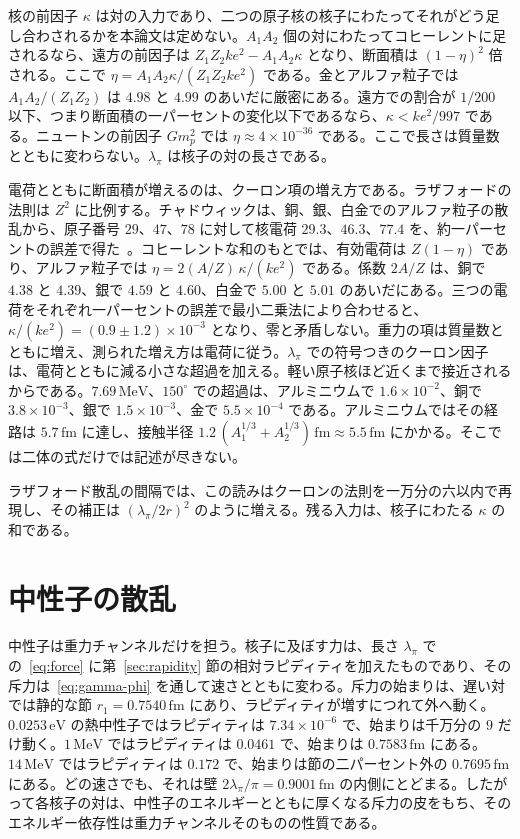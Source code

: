 \documentclass[a4paper]{article}
\begin{document}
核の前因子 \(\kappa\) は対の入力であり、二つの原子核の核子にわたってそれがどう足し合わされるかを本論文は定めない。\(A_1A_2\) 個の対にわたってコヒーレントに足されるなら、遠方の前因子は \(Z_1Z_2ke^{2}-A_1A_2\kappa\) となり、断面積は \((1-\eta)^{2}\) 倍される。ここで \(\eta=A_1A_2\kappa/(Z_1Z_2ke^{2})\) である。金とアルファ粒子では \(A_1A_2/(Z_1Z_2)\) は \(4.98\) と \(4.99\) のあいだに厳密にある。遠方での割合が \(1/200\) 以下、つまり断面積の一パーセントの変化以下であるなら、\(\kappa<ke^{2}/997\) である。ニュートンの前因子 \(Gm_p^{2}\) では \(\eta\approx 4\times 10^{-36}\) である。ここで長さは質量数とともに変わらない。\(\lambda_\pi\) は核子の対の長さである。

電荷とともに断面積が増えるのは、クーロン項の増え方である。ラザフォードの法則は \(Z^{2}\) に比例する。チャドウィックは、銅、銀、白金でのアルファ粒子の散乱から、原子番号 \(29\)、\(47\)、\(78\) に対して核電荷 \(29.3\)、\(46.3\)、\(77.4\) を、約一パーセントの誤差で得た~\cite{chadwick1920}。コヒーレントな和のもとでは、有効電荷は \(Z(1-\eta)\) であり、アルファ粒子では \(\eta=2(A/Z)\,\kappa/(ke^{2})\) である。係数 \(2A/Z\) は、銅で \(4.38\) と \(4.39\)、銀で \(4.59\) と \(4.60\)、白金で \(5.00\) と \(5.01\) のあいだにある。三つの電荷をそれぞれ一パーセントの誤差で最小二乗法により合わせると、\(\kappa/(ke^{2})=(0.9\pm 1.2)\times 10^{-3}\) となり、零と矛盾しない。重力の項は質量数とともに増え、測られた増え方は電荷に従う。\(\lambda_\pi\) での符号つきのクーロン因子は、電荷とともに減る小さな超過を加える。軽い原子核ほど近くまで接近されるからである。\(7.69\,\mathrm{MeV}\)、\(150^\circ\) での超過は、アルミニウムで \(1.6\times 10^{-2}\)、銅で \(3.8\times 10^{-3}\)、銀で \(1.5\times 10^{-3}\)、金で \(5.5\times 10^{-4}\) である。アルミニウムではその経路は \(5.7\,\mathrm{fm}\) に達し、接触半径 \(1.2\,(A_1^{1/3}+A_2^{1/3})\,\mathrm{fm}\approx 5.5\,\mathrm{fm}\) にかかる。そこでは二体の式だけでは記述が尽きない。

ラザフォード散乱の間隔では、この読みはクーロンの法則を一万分の六以内で再現し、その補正は \((\lambda_\pi/2r)^{2}\) のように増える。残る入力は、核子にわたる \(\kappa\) の和である。

\section{中性子の散乱}
\label{sec:neutron}

中性子は重力チャンネルだけを担う。核子に及ぼす力は、長さ \(\lambda_\pi\) での~\eqref{eq:force} に第~\ref{sec:rapidity} 節の相対ラピディティを加えたものであり、その斥力は~\eqref{eq:gamma-phi} を通して速さとともに変わる。斥力の始まりは、遅い対では静的な節 \(r_1=0.7540\,\mathrm{fm}\) にあり、ラピディティが増すにつれて外へ動く。\(0.0253\,\mathrm{eV}\) の熱中性子ではラピディティは \(7.34\times 10^{-6}\) で、始まりは千万分の \(9\) だけ動く。\(1\,\mathrm{MeV}\) ではラピディティは \(0.0461\) で、始まりは \(0.7583\,\mathrm{fm}\) にある。\(14\,\mathrm{MeV}\) ではラピディティは \(0.172\) で、始まりは節の二パーセント外の \(0.7695\,\mathrm{fm}\) にある。どの速さでも、それは壁 \(2\lambda_\pi/\pi=0.9001\,\mathrm{fm}\) の内側にとどまる。したがって各核子の対は、中性子のエネルギーとともに厚くなる斥力の皮をもち、そのエネルギー依存性は重力チャンネルそのものの性質である。
\end{document}
